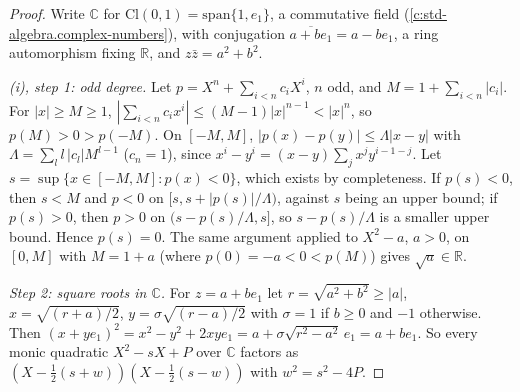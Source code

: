 \documentclass[11pt]{article}
\theoremstyle{definition}
\theoremstyle{plain}
\providecommand{\C}{}\renewcommand{\C}{\mathbb{C}}
\providecommand{\Cl}{}\renewcommand{\Cl}{\mathrm{Cl}}
\providecommand{\R}{}\renewcommand{\R}{\mathbb{R}}
\begin{document}
\begin{proof}
Write $\C$ for $\Cl(0,1) = \mathrm{span}\{1, e_{1}\}$, a commutative field (\ref{c:std-algebra.complex-numbers}), with conjugation $\overline{a + be_{1}} = a - be_{1}$, a ring automorphism fixing $\R$, and $z\bar{z} = a^{2} + b^{2}$.

\emph{(i), step 1: odd degree.} Let $p = X^{n} + \sum_{i < n}c_{i}X^{i}$, $n$ odd, and $M = 1 + \sum_{i < n}|c_{i}|$. For $|x| \ge M \ge 1$, $|\sum_{i<n}c_{i}x^{i}| \le (M - 1)|x|^{n-1} < |x|^{n}$, so $p(M) > 0 > p(-M)$. On $[-M, M]$, $|p(x) - p(y)| \le \Lambda|x - y|$ with $\Lambda = \sum_{l}l\,|c_{l}|M^{l-1}$ ($c_{n} = 1$), since $x^{i} - y^{i} = (x - y)\sum_{j}x^{j}y^{i-1-j}$. Let $s = \sup\{x \in [-M, M] : p(x) < 0\}$, which exists by completeness. If $p(s) < 0$, then $s < M$ and $p < 0$ on $[s, s + |p(s)|/\Lambda)$, against $s$ being an upper bound; if $p(s) > 0$, then $p > 0$ on $(s - p(s)/\Lambda, s]$, so $s - p(s)/\Lambda$ is a smaller upper bound. Hence $p(s) = 0$. The same argument applied to $X^{2} - a$, $a > 0$, on $[0, M]$ with $M = 1 + a$ (where $p(0) = -a < 0 < p(M)$) gives $\sqrt{a} \in \R$.

\emph{Step 2: square roots in $\C$.} For $z = a + be_{1}$ let $r = \sqrt{a^{2} + b^{2}} \ge |a|$, $x = \sqrt{(r + a)/2}$, $y = \sigma\sqrt{(r - a)/2}$ with $\sigma = 1$ if $b \ge 0$ and $-1$ otherwise. Then $(x + ye_{1})^{2} = x^{2} - y^{2} + 2xye_{1} = a + \sigma\sqrt{r^{2} - a^{2}}\,e_{1} = a + be_{1}$. So every monic quadratic $X^{2} - sX + P$ over $\C$ factors as $(X - \tfrac12(s + w))(X - \tfrac12(s - w))$ with $w^{2} = s^{2} - 4P$.


\end{proof}
\end{document}

